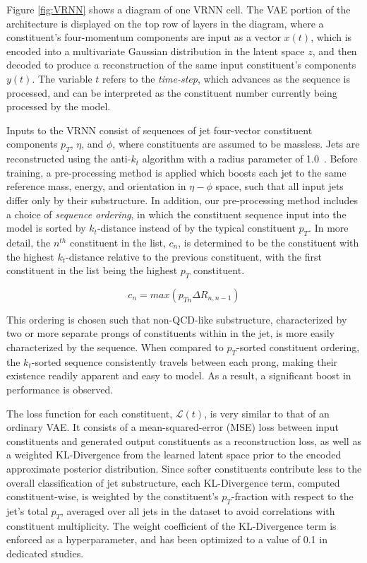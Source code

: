 \documentclass[letterpaper,11pt]{article}
\begin{document}
Figure \ref{fig:VRNN} shows a diagram of one VRNN cell. The VAE portion of the architecture is displayed on the top row of layers in the diagram, where a constituent's four-momentum components are input as a vector $x(t)$, which is encoded into a multivariate Gaussian distribution in the latent space $z$, and then decoded to produce a reconstruction of the same input constituent's components $y(t)$. The variable $t$ refers to the \textit{time-step}, which advances as the sequence is processed, and can be interpreted as the constituent number currently being processed by the model. 


Inputs to the VRNN consist of sequences of jet four-vector constituent components $p_{T}$, $\eta$, and $\phi$, where constituents are assumed to be massless.
Jets are reconstructed using the anti-$k_t$ algorithm with a radius parameter of 1.0~\cite{Cacciari_2008}.
Before training, a pre-processing method is applied which boosts each jet to the same reference mass, energy, and orientation in $\eta-\phi$ space, such that all input jets differ only by their substructure.
In addition, our pre-processing method includes a choice of \textit{sequence ordering}, in which the constituent sequence input into the model is sorted by $k_{t}$-distance instead of by the typical constituent $p_{T}$. 
In more detail, the $n^{th}$ constituent in the list, $c_{n}$, is determined to be the constituent with the highest $k_{t}$-distance relative to the previous constituent, with the first constituent in the list being the highest $p_{T}$ constituent. 

\begin{equation}
c_{n} = max(p_{Tn}\Delta R_{n, n-1})
\end{equation}

This ordering is chosen such that non-QCD-like substructure, characterized by two or more separate prongs of constituents within in the jet, is more easily characterized by the sequence. 
When compared to $p_{T}$-sorted constituent ordering, the $k_{t}$-sorted sequence consistently travels between each prong, making their existence readily apparent and easy to model. As a result, a significant boost in performance is observed.

The loss function for each constituent, $\mathcal{L}(t)$, is very similar to that of an ordinary VAE. 
It consists of a mean-squared-error (MSE) loss between input constituents and generated output constituents as a reconstruction loss, as well as a weighted KL-Divergence from the learned latent space prior to the encoded approximate posterior distribution. 
Since softer constituents contribute less to the overall classification of jet substructure, each KL-Divergence term, computed constituent-wise, is weighted by the constituent's $p_{T}$-fraction with respect to the jet's total $p_{T}$, averaged over all jets in the dataset to avoid correlations with constituent multiplicity. 
The weight coefficient of the KL-Divergence term is enforced as a hyperparameter, and has been optimized to a value of 0.1 in dedicated studies. 
\end{document}
